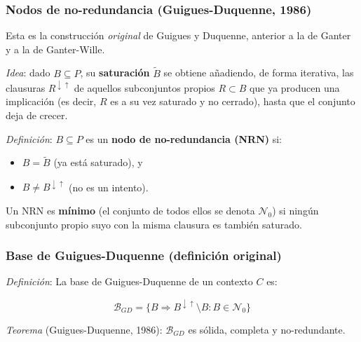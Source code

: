 \documentclass{beamer}
\begin{document}
  \begin{frame}
    \frametitle{Nodos de no-redundancia (Guigues-Duquenne, 1986)}
    Esta es la construcción \emph{original} de Guigues y Duquenne,
    anterior a la de Ganter y a la de Ganter-Wille.

    \bigskip
    \pause

    \textit{Idea}: dado $B \subseteq P$, su \textbf{saturación}
    $\widetilde{B}$ se obtiene añadiendo, de forma iterativa,
    las clausuras $R^{\downarrow\uparrow}$ de aquellos subconjuntos
    propios $R \subset B$ que ya producen una implicación
    (es decir, $R$ es a su vez saturado y no cerrado), hasta que
    el conjunto deja de crecer.

    \bigskip
    \pause

    \textit{Definición}: $B \subseteq P$ es un
    \textbf{nodo de no-redundancia (NRN)} si:
    \begin{itemize}[<+->]
      \item $B = \widetilde{B}$ (ya está saturado), y
      \item $B \neq B^{\downarrow\uparrow}$ (no es un intento).
    \end{itemize}

    \pause
    Un NRN es \textbf{mínimo} (el conjunto de todos ellos se
    denota $\mathcal{N}_0$) si ningún subconjunto propio suyo con
    la misma clausura es también saturado.
  \end{frame}

  \begin{frame}
    \frametitle{Base de Guigues-Duquenne (definición original)}
    \textit{Definición}: La base de Guigues-Duquenne de un
    contexto $C$ es:

    \[
      \mathcal{B}_{GD} = \{B \Rightarrow B^{\downarrow\uparrow}\setminus B :
      B \in \mathcal{N}_0\}
    \]

    \bigskip
    \pause

    \textit{Teorema} (Guigues-Duquenne, 1986): $\mathcal{B}_{GD}$
    es sólida, completa y no-redundante.
  \end{frame}
\end{document}
